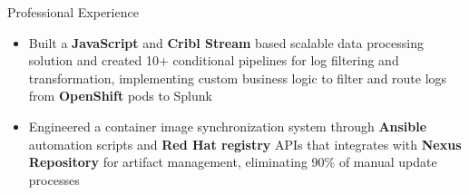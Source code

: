 \documentclass{resume}
\begin{document}

    \begin{experienceSection}{Professional Experience}


    \experienceItem[
        company={Arch Mortgage Insurance},
        location={Greensboro, NC},
        position={Software Engineer Intern},
        duration={Jun 2024 - Aug 2024}
    ]
    \begin{itemize}
        \itemsep -6pt {}
        \item Built a \textbf{JavaScript} and \textbf{Cribl Stream} based scalable data processing solution and created 10+ conditional pipelines for log filtering and transformation, implementing custom business logic to filter and route logs from \textbf{OpenShift} pods to Splunk
        \item Engineered a container image synchronization system through \textbf{Ansible} automation scripts and \textbf{Red Hat registry} APIs that integrates with \textbf{Nexus Repository} for artifact management, eliminating 90\% of manual update processes
        
    \end{itemize}


\end{experienceSection}
\end{document}
